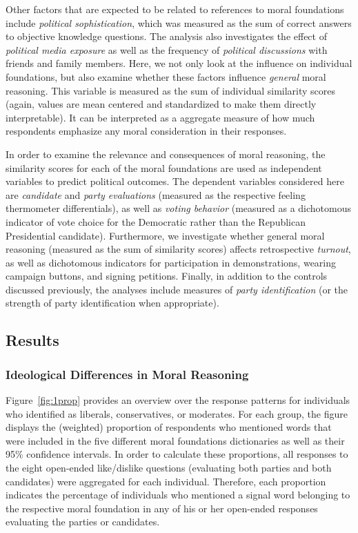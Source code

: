 \documentclass[12pt]{article}
\begin{document}
Other factors that are expected to be related to references to moral foundations include \textit{political sophistication}, which was measured as the sum of correct answers to objective knowledge questions. The analysis also investigates the effect of \textit{political media exposure} as well as the frequency of \textit{political discussions} with friends and family members. Here, we not only look at the influence on individual foundations, but also examine whether these factors influence \textit{general} moral reasoning. This variable is measured as the sum of individual similarity scores (again, values are mean centered and standardized to make them directly interpretable). It can be interpreted as a aggregate measure of how much respondents emphasize any moral consideration in their responses.

In order to examine the relevance and consequences of moral reasoning, the similarity scores for each of the moral foundations are used as independent variables to predict political outcomes. The dependent variables considered here are \textit{candidate} and \textit{party evaluations} (measured as the respective feeling thermometer differentials), as well as \textit{voting behavior} (measured as a dichotomous indicator of vote choice for the Democratic rather than the Republican Presidential candidate). Furthermore, we investigate whether general moral reasoning (measured as the sum of similarity scores) affects retrospective \textit{turnout}, as well as dichotomous indicators for participation in demonstrations, wearing campaign buttons, and signing petitions. Finally, in addition to the controls discussed previously, the analyses include measures of \textit{party identification} (or the strength of party identification when appropriate).



\subsection{Results}

\subsubsection{Ideological Differences in Moral Reasoning}

Figure~\ref{fig:1prop} provides an overview over the response patterns for individuals who identified as liberals, conservatives, or moderates. For each group, the figure displays the (weighted) proportion of respondents who mentioned words that were included in the five different moral foundations dictionaries as well as their 95\% confidence intervals. In order to calculate these proportions, all responses to the eight open-ended like/dislike questions (evaluating both parties and both candidates) were aggregated for each individual. Therefore, each proportion indicates the percentage of individuals who mentioned a signal word belonging to the respective moral foundation in any of his or her open-ended responses evaluating the parties or candidates.
\end{document}
